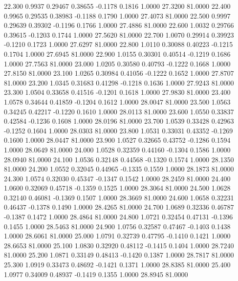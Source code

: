   22.300   0.9937   0.29467   0.38655  -0.1178   0.1816   1.0000  27.3200  81.0000
  22.400   0.9965   0.29535   0.38983  -0.1188   0.1790   1.0000  27.4073  81.0000
  22.500   0.9997   0.29639   0.39302  -0.1196   0.1766   1.0000  27.4886  81.0000
  22.600   1.0032   0.29766   0.39615  -0.1203   0.1744   1.0000  27.5620  81.0000
  22.700   1.0070   0.29914   0.39923  -0.1210   0.1723   1.0000  27.6297  81.0000
  22.800   1.0110   0.30088   0.40223  -0.1215   0.1704   1.0000  27.6945  81.0000
  22.900   1.0155   0.30301   0.40514  -0.1219   0.1686   1.0000  27.7563  81.0000
  23.000   1.0205   0.30580   0.40793  -0.1222   0.1668   1.0000  27.8150  81.0000
  23.100   1.0265   0.30984   0.41056  -0.1222   0.1652   1.0000  27.8707  81.0000
  23.200   1.0345   0.31683   0.41298  -0.1218   0.1636   1.0000  27.9243  81.0000
  23.300   1.0504   0.33658   0.41516  -0.1201   0.1618   1.0000  27.9830  81.0000
  23.400   1.0578   0.34644   0.41859  -0.1204   0.1612   1.0000  28.0047  81.0000
  23.500   1.0563   0.34245   0.42217  -0.1220   0.1610   1.0000  28.0113  81.0000
  23.600   1.0550   0.33837   0.42584  -0.1236   0.1608   1.0000  28.0196  81.0000
  23.700   1.0539   0.33428   0.42963  -0.1252   0.1604   1.0000  28.0303  81.0000
  23.800   1.0531   0.33031   0.43352  -0.1269   0.1600   1.0000  28.0447  81.0000
  23.900   1.0527   0.32665   0.43752  -0.1286   0.1594   1.0000  28.0649  81.0000
  24.000   1.0528   0.32359   0.44160  -0.1304   0.1586   1.0000  28.0940  81.0000
  24.100   1.0536   0.32148   0.44568  -0.1320   0.1574   1.0000  28.1350  81.0000
  24.200   1.0552   0.32045   0.44965  -0.1335   0.1559   1.0000  28.1873  81.0000
  24.300   1.0574   0.32030   0.45347  -0.1347   0.1542   1.0000  28.2459  81.0000
  24.400   1.0600   0.32069   0.45718  -0.1359   0.1525   1.0000  28.3064  81.0000
  24.500   1.0628   0.32140   0.46081  -0.1369   0.1507   1.0000  28.3669  81.0000
  24.600   1.0658   0.32231   0.46437  -0.1378   0.1490   1.0000  28.4265  81.0000
  24.700   1.0689   0.32336   0.46787  -0.1387   0.1472   1.0000  28.4864  81.0000
  24.800   1.0721   0.32454   0.47131  -0.1396   0.1455   1.0000  28.5463  81.0000
  24.900   1.0756   0.32587   0.47467  -0.1403   0.1438   1.0000  28.6061  81.0000
  25.000   1.0791   0.32739   0.47795  -0.1410   0.1421   1.0000  28.6653  81.0000
  25.100   1.0830   0.32920   0.48112  -0.1415   0.1404   1.0000  28.7240  81.0000
  25.200   1.0871   0.33149   0.48413  -0.1420   0.1387   1.0000  28.7817  81.0000
  25.300   1.0919   0.33473   0.48692  -0.1421   0.1371   1.0000  28.8385  81.0000
  25.400   1.0977   0.34009   0.48937  -0.1419   0.1355   1.0000  28.8945  81.0000
